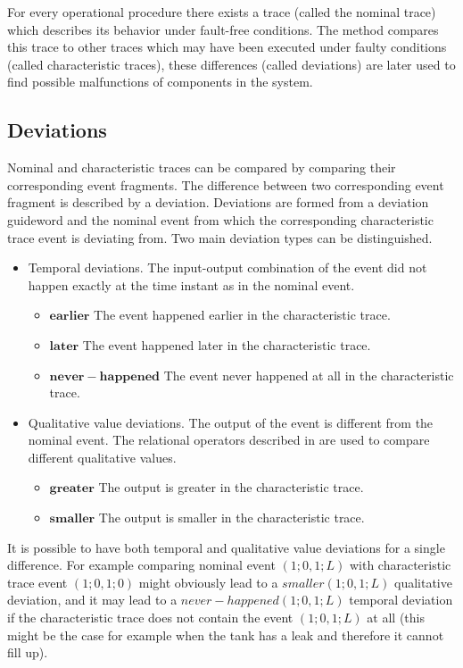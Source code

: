 \documentclass[conference]{IEEEtran}
\begin{document}
For every operational procedure there exists a trace (called the nominal trace) which describes its behavior under fault-free conditions. The method compares this trace to other traces which may have been executed under faulty conditions (called characteristic traces), these differences (called deviations) are later used to find possible malfunctions of components in the system.

\subsection{Deviations}
\label{sec:deviations}
Nominal and characteristic traces can be compared by comparing their corresponding event fragments. The difference between two corresponding event fragment is described by a deviation. Deviations are formed from a deviation guideword and the nominal event from which the corresponding characteristic trace event is deviating from. Two main deviation types can be distinguished.

\begin{itemize}
\item Temporal deviations. The input-output combination of the event did not happen exactly at the time instant as in the nominal event. 
	\begin{itemize}
	  \item $\mathbf{earlier}$ The event happened earlier in the characteristic trace.
	  \item $\mathbf{later}$ The event happened later in the characteristic trace.
	  \item $\mathbf{never-happened}$ The event never happened at all in the characteristic trace.
	\end{itemize}
\item Qualitative value deviations. The output of the event is different from the nominal event. The relational operators described in \cite{KES2010} are used to compare different qualitative values.
	\begin{itemize}
	  \item $\mathbf{greater}$ The output is greater in the characteristic trace.
	  \item $\mathbf{smaller}$ The output is smaller in the characteristic trace.
	\end{itemize}
\end{itemize}

It is possible to have both temporal and qualitative value deviations for a single difference. For example comparing nominal event $(1;0,1;L)$ with characteristic trace event $(1;0,1;0)$ might obviously lead to a $smaller(1;0,1;L)$ qualitative deviation, and it may lead to a $never-happened(1;0,1;L)$ temporal deviation if the characteristic trace does not contain the event $(1;0,1;L)$ at all (this might be the case for example when the tank has a leak and therefore it cannot fill up).
\end{document}
